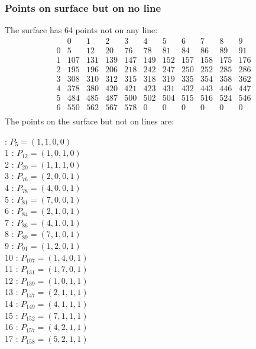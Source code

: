 \documentclass{article}
\begin{document}
{\subsubsection*{Points on surface but on no line}
The surface has 64 points not on any line:\\
$$
\begin{array}{r|*{10}{r}}
 & 0 & 1 & 2 & 3 & 4 & 5 & 6 & 7 & 8 & 9\\
\hline
0 & 5 & 12 & 20 & 76 & 78 & 81 & 84 & 86 & 89 & 91\\
1 & 107 & 131 & 139 & 147 & 149 & 152 & 157 & 158 & 175 & 176\\
2 & 195 & 196 & 206 & 218 & 242 & 247 & 250 & 252 & 285 & 286\\
3 & 308 & 310 & 312 & 315 & 318 & 319 & 335 & 354 & 358 & 362\\
4 & 378 & 380 & 420 & 421 & 423 & 431 & 432 & 443 & 446 & 447\\
5 & 484 & 485 & 487 & 500 & 502 & 504 & 515 & 516 & 524 & 546\\
6 & 550 & 562 & 567 & 578 & 0 & 0 & 0 & 0 & 0 & 0\\
\end{array}
$$
The points on the surface but not on lines are:\\
\begin{multicols}{2}
 : $P_{5}=( 1, 1, 0, 0 )$\\
1 : $P_{12}=( 1, 0, 1, 0 )$\\
2 : $P_{20}=( 1, 1, 1, 0 )$\\
3 : $P_{76}=( 2, 0, 0, 1 )$\\
4 : $P_{78}=( 4, 0, 0, 1 )$\\
5 : $P_{81}=( 7, 0, 0, 1 )$\\
6 : $P_{84}=( 2, 1, 0, 1 )$\\
7 : $P_{86}=( 4, 1, 0, 1 )$\\
8 : $P_{89}=( 7, 1, 0, 1 )$\\
9 : $P_{91}=( 1, 2, 0, 1 )$\\
10 : $P_{107}=( 1, 4, 0, 1 )$\\
11 : $P_{131}=( 1, 7, 0, 1 )$\\
12 : $P_{139}=( 1, 0, 1, 1 )$\\
13 : $P_{147}=( 2, 1, 1, 1 )$\\
14 : $P_{149}=( 4, 1, 1, 1 )$\\
15 : $P_{152}=( 7, 1, 1, 1 )$\\
16 : $P_{157}=( 4, 2, 1, 1 )$\\
17 : $P_{158}=( 5, 2, 1, 1 )$\\

\end{multicols}}
\end{document}
